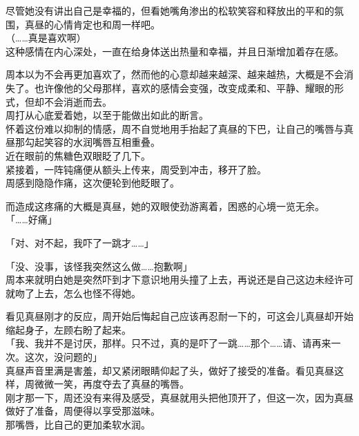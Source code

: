 尽管她没有讲出自己是幸福的，但看她嘴角渗出的松软笑容和释放出的平和的氛围，真昼的心情肯定也和周一样吧。\\

（……真是喜欢啊）\\

这种感情在内心深处，一直在给身体送出热量和幸福，并且日渐增加着存在感。

周本以为不会再更加喜欢了，然而他的心意却越来越深、越来越热，大概是不会消失了。也许像他的父母那样，喜欢的感情会变强，改变成柔和、平静、耀眼的形式，但却不会消逝而去。\\

周打从心底爱着她，以至于能做出如此的断言。\\

怀着这份难以抑制的情感，周不自觉地用手抬起了真昼的下巴，让自己的嘴唇与真昼那勾起笑容的水润嘴唇互相重叠。\\

近在眼前的焦糖色双眼眨了几下。\\

紧接着，一阵钝痛便从额头上传来，周受到冲击，移开了脸。\\

周感到隐隐作痛，这次便轮到他眨眼了。

而造成这疼痛的大概是真昼，她的双眼使劲游离着，困惑的心境一览无余。\\

「……好痛」

「对、对不起，我吓了一跳才……」

「没、没事，该怪我突然这么做……抱歉啊」\\

周本来就明白她是突然吓到才下意识地用头撞了上去，再说还是自己这边未经许可就吻了上去，怎么也怪不得她。

看见真昼刚才的反应，周开始后悔起自己应该再忍耐一下的，可这会儿真昼却开始缩起身子，左顾右盼了起来。\\

「我、我并不是讨厌，那样。只不过，真的是吓了一跳……那个……请、请再来一次。这次，没问题的」\\

真昼声音里满是害羞，却又紧闭眼睛仰起了头，做好了接受的准备。看见真昼这样，周微微一笑，再度夺去了真昼的嘴唇。\\

刚才那一下，周还没有来得及感受，真昼就用头把他顶开了，但这一次，因为真昼做好了准备，周便得以享受那滋味。\\

那嘴唇，比自己的更加柔软水润。

